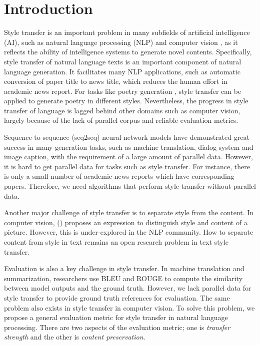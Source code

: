 \documentclass[letterpaper]{article} \usepackage{aaai18}  \usepackage{times}  \usepackage{helvet}  \usepackage{courier}  \usepackage{url}  \usepackage{graphicx}  \usepackage{amsmath}
\newcommand{\newcite}[1]{\citeauthor{#1} (\citeyear{#1})}
\begin{document}
\section{Introduction}
Style transfer is an important problem in many subfields of artificial intelligence (AI), such as natural language processing (NLP) and computer vision \cite{gatys2016image,gatys2016preserving,zhu2017unpaired,li2017demystifying}, as it reflects the ability of intelligence systems to generate novel contents.
Specifically, style transfer of natural language texts is an important component of natural language generation. It facilitates many NLP applications, such as automatic conversion of paper title to news title, which reduces the human effort in academic news report. For tasks like poetry generation \cite{yan2013poet,yan2016poet,ghazvininejad2016generating}, style transfer can be applied to generate poetry in different styles.
Nevertheless, the progress in style transfer of language is lagged 
behind other domains such as computer vision, largely because of the lack 
of parallel corpus and reliable evaluation metrics. 

Sequence to sequence (seq2seq) neural network models \cite{sutskever2014sequence} have demonstrated great success in many generation tasks, 
such as machine translation, dialog system and image caption, with the requirement of a large amount of parallel data. 
However, it is hard to get parallel data for tasks such as style transfer. 
For instance, there is only a small number of academic news reports which have corresponding papers.
Therefore, we need algorithms that perform style transfer without parallel data. 

Another major challenge of style transfer is to separate style from the content. In computer vision, \newcite{li2017demystifying} proposes an expression to distinguish style and content of a picture. However, this is under-explored in the NLP community.
How to separate content from style in text remains an open research problem in text style transfer. 

Evaluation is also a key challenge in style transfer. In machine translation and summarization, researchers use BLEU \cite{papineni2002bleu} and ROUGE \cite{lin2004rouge} to compute the similarity between model outputs and the ground truth. However, we lack parallel data for style transfer to provide ground truth references for evaluation. The same problem also exists in style transfer in computer vision. 
To solve this problem, we propose a general evaluation metric for style transfer in natural language processing. There are two aspects of the evaluation metric; one is {\it transfer strength} and the other is {\it content preservation}. 
\end{document}
